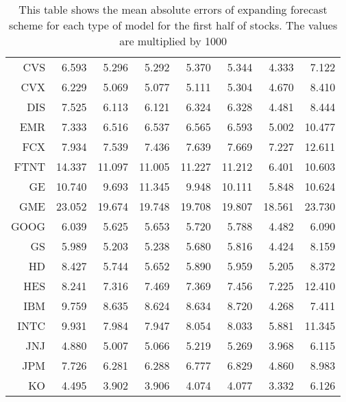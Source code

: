 \begin{table}[ht]
\begin{tabular}{rrrrrrrr}
  CVS & 6.593 & 5.296 & 5.292 & 5.370 & 5.344 & 4.333 & 7.122 \\ 
  CVX & 6.229 & 5.069 & 5.077 & 5.111 & 5.304 & 4.670 & 8.410 \\ 
  DIS & 7.525 & 6.113 & 6.121 & 6.324 & 6.328 & 4.481 & 8.444 \\ 
  EMR & 7.333 & 6.516 & 6.537 & 6.565 & 6.593 & 5.002 & 10.477 \\ 
  FCX & 7.934 & 7.539 & 7.436 & 7.639 & 7.669 & 7.227 & 12.611 \\ 
  FTNT & 14.337 & 11.097 & 11.005 & 11.227 & 11.212 & 6.401 & 10.603 \\ 
  GE & 10.740 & 9.693 & 11.345 & 9.948 & 10.111 & 5.848 & 10.624 \\ 
  GME & 23.052 & 19.674 & 19.748 & 19.708 & 19.807 & 18.561 & 23.730 \\ 
  GOOG & 6.039 & 5.625 & 5.653 & 5.720 & 5.788 & 4.482 & 6.090 \\ 
  GS & 5.989 & 5.203 & 5.238 & 5.680 & 5.816 & 4.424 & 8.159 \\ 
  HD & 8.427 & 5.744 & 5.652 & 5.890 & 5.959 & 5.205 & 8.372 \\ 
  HES & 8.241 & 7.316 & 7.469 & 7.369 & 7.456 & 7.225 & 12.410 \\ 
  IBM & 9.759 & 8.635 & 8.624 & 8.634 & 8.720 & 4.268 & 7.411 \\ 
  INTC & 9.931 & 7.984 & 7.947 & 8.054 & 8.033 & 5.881 & 11.345 \\ 
  JNJ & 4.880 & 5.007 & 5.066 & 5.219 & 5.269 & 3.968 & 6.115 \\ 
  JPM & 7.726 & 6.281 & 6.288 & 6.777 & 6.829 & 4.860 & 8.983 \\ 
  KO & 4.495 & 3.902 & 3.906 & 4.074 & 4.077 & 3.332 & 6.126 \\ 
   \hline
\end{tabular}
\caption[MAE expanding forecast (1)]{This table shows the mean absolute errors of expanding forecast scheme for each type of model for the first half of stocks. 
                     The values are multiplied by 1000} 
\label{Table:MAE_e_1}
\end{table}
